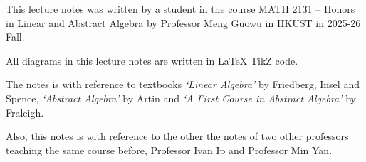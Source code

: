 \documentclass[
	11pt, %
	fleqn, %
	a4paper, %
]{LegrandOrangeBook}
\begin{document}
\tableofcontents %

\cleardoublepage %

\pagestyle{fancy} %

\newpage


\vspace{8pt}

\noindent This lecture notes was written by a student in the course MATH 2131 -- Honors in Linear and Abstract Algebra by Professor Meng Guowu in HKUST in 2025-26 Fall. 

\noindent All diagrams in this lecture notes are written in LaTeX TikZ code.

\noindent The notes is with reference to textbooks \textit{`Linear Algebra'} by Friedberg, Insel and Spence, \textit{`Abstract Algebra'} by Artin and \textit{`A First Course in Abstract Algebra'} by Fraleigh. 

\noindent Also, this notes is with reference to the other the notes of two other professors teaching the same course before, Professor Ivan Ip and Professor Min Yan.

\newpage


\vspace{8pt}
\end{document}
